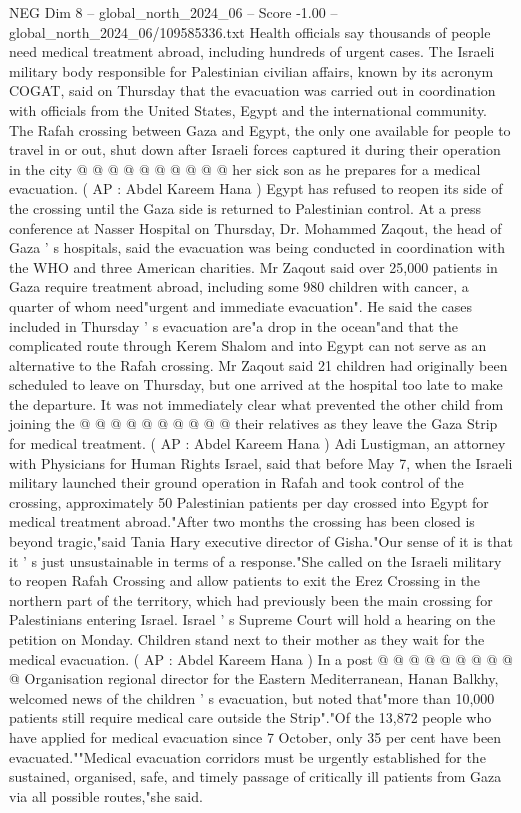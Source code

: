 \begin{textsample}{NEG Dim 8 – global\_north\_2024\_06 – Score -1.00 – global\_north\_2024\_06/109585336.txt}
Health officials say thousands of people need medical treatment abroad, including hundreds of urgent cases.
The Israeli military body responsible for Palestinian civilian affairs, known by its acronym COGAT, said on Thursday that the evacuation was carried out in coordination with officials from the United States, Egypt and the international community.
The Rafah crossing between Gaza and Egypt, the only one available for people to travel in or out, shut down after Israeli forces captured it during their operation in the city @ @ @ @ @ @ @ @ @ @ her sick son as he prepares for a medical evacuation. ( AP : Abdel Kareem Hana ) Egypt has refused to reopen its side of the crossing until the Gaza side is returned to Palestinian control.
At a press conference at Nasser Hospital on Thursday, Dr.
Mohammed Zaqout, the head of Gaza ' s hospitals, said the evacuation was being conducted in coordination with the WHO and three American charities.
Mr Zaqout said over 25,000 patients in Gaza require treatment abroad, including some 980 children with cancer, a quarter of whom need"urgent and immediate evacuation".
He said the cases included in Thursday ' s evacuation are"a drop in the ocean"and that the complicated route through Kerem Shalom and into Egypt can not serve as an alternative to the Rafah crossing.
Mr Zaqout said 21 children had originally been scheduled to leave on Thursday, but one arrived at the hospital too late to make the departure.
It was not immediately clear what prevented the other child from joining the @ @ @ @ @ @ @ @ @ @ their relatives as they leave the Gaza Strip for medical treatment. ( AP : Abdel Kareem Hana ) Adi Lustigman, an attorney with Physicians for Human Rights Israel, said that before May 7, when the Israeli military launched their ground operation in Rafah and took control of the crossing, approximately 50 Palestinian patients per day crossed into Egypt for medical treatment abroad."After two months the crossing has been closed is beyond tragic,"said Tania Hary executive director of Gisha."Our sense of it is that it ' s just unsustainable in terms of a response."She called on the Israeli military to reopen Rafah Crossing and allow patients to exit the Erez Crossing in the northern part of the territory, which had previously been the main crossing for Palestinians entering Israel.
Israel ' s Supreme Court will hold a hearing on the petition on Monday.
Children stand next to their mother as they wait for the medical evacuation. ( AP : Abdel Kareem Hana ) In a post @ @ @ @ @ @ @ @ @ @ Organisation regional director for the Eastern Mediterranean, Hanan Balkhy, welcomed news of the children ' s evacuation, but noted that"more than 10,000 patients still require medical care outside the Strip"."Of the 13,872 people who have applied for medical evacuation since 7 October, only 35 per cent have been evacuated.""Medical evacuation corridors must be urgently established for the sustained, organised, safe, and timely passage of critically ill patients from Gaza via all possible routes,"she said.

\end{textsample}
